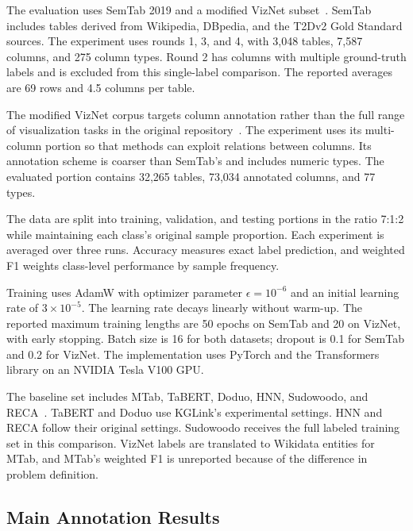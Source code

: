 The evaluation uses SemTab 2019 and a modified VizNet subset~\cite{kglink-hassanzadeh_oktie_2019_3518539,kglink-zhang2020sato}. SemTab includes tables derived from Wikipedia, DBpedia, and the T2Dv2 Gold Standard sources. The experiment uses rounds 1, 3, and 4, with 3,048 tables, 7,587 columns, and 275 column types. Round 2 has columns with multiple ground-truth labels and is excluded from this single-label comparison. The reported averages are 69 rows and 4.5 columns per table.

The modified VizNet corpus targets column annotation rather than the full range of visualization tasks in the original repository~\cite{kglink-hu2019viznet}. The experiment uses its multi-column portion so that methods can exploit relations between columns. Its annotation scheme is coarser than SemTab's and includes numeric types. The evaluated portion contains 32,265 tables, 73,034 annotated columns, and 77 types.

The data are split into training, validation, and testing portions in the ratio 7:1:2 while maintaining each class's original sample proportion. Each experiment is averaged over three runs. Accuracy measures exact label prediction, and weighted F1 weights class-level performance by sample frequency.

Training uses AdamW with optimizer parameter $\epsilon=10^{-6}$ and an initial learning rate of $3\times10^{-5}$. The learning rate decays linearly without warm-up. The reported maximum training lengths are 50 epochs on SemTab and 20 on VizNet, with early stopping. Batch size is 16 for both datasets; dropout is 0.1 for SemTab and 0.2 for VizNet. The implementation uses PyTorch and the Transformers library on an NVIDIA Tesla V100 GPU.

The baseline set includes MTab, TaBERT, Doduo, HNN, Sudowoodo, and RECA~\cite{kglink-2021_mtab4wikidata,kglink-yin2020tabert,kglink-suhara2022annotating,kglink-chen2019learning,kglink-wang2022sudowoodo,kglink-sun2023reca}. TaBERT and Doduo use KGLink's experimental settings. HNN and RECA follow their original settings. Sudowoodo receives the full labeled training set in this comparison. VizNet labels are translated to Wikidata entities for MTab, and MTab's weighted F1 is unreported because of the difference in problem definition.

\subsection{Main Annotation Results}
\label{sec:kglink:main-results}

